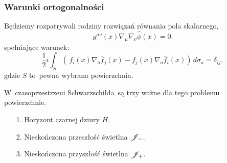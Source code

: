 \documentclass[10pt,t]{beamer}
\begin{document}
\begin{frame}
  \frametitle{Warunki ortogonalności}


  Będziemy rozpatrywali rodziny rozwiązań równania pola skalarnego,
  \begin{equation}
    \label{eq:Promieniowanie-Hawkinga-37}
    g^{ \mu \nu }( x ) \nabla_{ \mu } \nabla_{ \nu } \widehat{ \phi }( x ) = 0.
  \end{equation}
  spełniające warunek:
  \begin{equation}
    \label{eq:Promieniowanie-Hawkinga-38}
    \frac{ 1 }{ 2 } i\int_{ S } ( \, f_{ i }( x )
    \nabla_{ a }\bar{ f }_{ j }( x ) - f_{ j }( x )
    \nabla_{ a } \bar{ f }_{ i }( x ) )\, d\sigma_{ a }
    = \delta_{ i j },
  \end{equation}
  gdzie $S$ to~pewna wybrana powierzchnia.

  W~czasoprzestrzeni Schwarzschilda~są trzy ważne dla tego problemu
  powierzchnie.
  \begin{itemize}
    \RaggedRight

  \item[1.] Horyzont czarnej dziury $H$.

  \item[2.] Nieskończona przeszłość świetlna $\mathcal{J}_{ - }$.

  \item[3.] Nieskończona przyszłość świetlna $\mathcal{J}_{ + }$.

  \end{itemize}

\end{frame}
\end{document}
